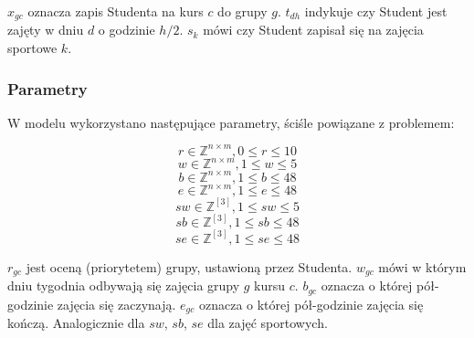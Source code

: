 \documentclass{article}
\theoremstyle{definition}
\theoremstyle{remark}
\theoremstyle{plain}
\theoremstyle{remark}
\theoremstyle{plain}
\begin{document}
$x_{gc}$ oznacza zapis Studenta na kurs $c$ do grupy $g$. 
$t_{dh}$ indykuje czy Student jest zajęty w dniu $d$ o godzinie $h/2$.
$s_k$ mówi czy Student zapisał się na zajęcia sportowe $k$.

\subsubsection{Parametry}
W modelu wykorzystano następujące parametry, ściśle powiązane z problemem:

\[ r \in \mathbb{Z}^{n\times m}, 0 \leq r \leq 10 \]
\[ w \in \mathbb{Z}^{n\times m}, 1 \leq w \leq 5 \]
\[ b \in \mathbb{Z}^{n\times m}, 1 \leq b \leq 48 \]
\[ e \in \mathbb{Z}^{n\times m}, 1 \leq e \leq 48 \]
\[ sw \in \mathbb{Z}^{[3]}, 1 \leq sw \leq 5 \]
\[ sb \in \mathbb{Z}^{[3]}, 1 \leq sb \leq 48 \]
\[ se \in \mathbb{Z}^{[3]}, 1 \leq se \leq 48 \]

$r_{gc}$ jest oceną (priorytetem) grupy, ustawioną przez Studenta. 
$w_{gc}$ mówi w którym dniu tygodnia odbywają się zajęcia grupy $g$ kursu $c$.
$b_{gc}$ oznacza o której pół-godzinie zajęcia się zaczynają.
$e_{gc}$ oznacza o której pół-godzinie zajęcia się kończą.
Analogicznie dla $sw$, $sb$, $se$ dla zajęć sportowych.
\end{document}
